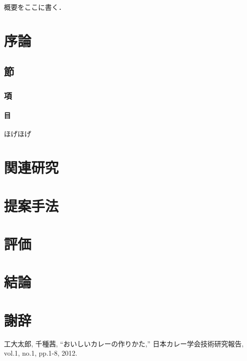 \documentclass[a4paper,12pt]{jsarticle}
\date{平成xx年3月}
\begin{document}
\Front %
\MakeTitlePage

\begin{Abstract}
概要をここに書く．
\end{Abstract}

\TableOfContents

\Main %

\section{序論}

\subsection{節}

\subsubsection{項}

\paragraph{目}
ほげほげ

\section{関連研究}

\section{提案手法}

\section{評価}

\section{結論}

\section*{謝辞}

\begin{thebibliography}{99} %
\end{thebibliography}

\begin{Achievements} %

工大太郎, 千種茜,
``おいしいカレーの作りかた,''
日本カレー学会技術研究報告, vol.1, no.1, pp.1-8, 2012.

\end{Achievements}
\end{document}
